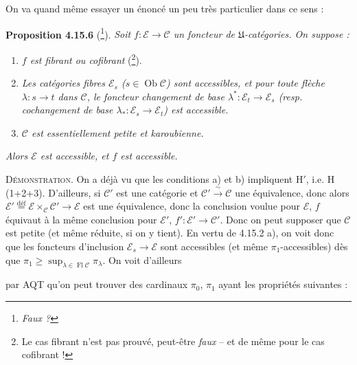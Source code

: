 \documentclass[11pt]{article}
\newcommand{\msp}[1]{\marginpar{\footnotesize [#1]}}
\newcommand{\cE}{\mathcal{E}}
\newcommand{\cC}{\mathcal{C}}
\newcommand{\Ob}{\operatorname{Ob}}
\newcommand{\Fl}{\operatorname{Fl}}
\begin{document}
On va quand même essayer un énoncé un peu très particulier dans ce sens :

\msp{page 435}\textbf{Proposition 4.15.6} (\footnote[180]{\textit{Faux ?}}). \textit{Soit $f : \cE \longrightarrow \cC$ un foncteur de $\mathfrak{U}$-catégories. On suppose :}
\begin{enumerate}
\item[\textit{a)}] \textit{$f$ est fibrant ou cofibrant} (\footnote[181]{Le cas fibrant n'est pas prouvé, peut-être \textit{faux} -- et de même pour le cas cofibrant !}).
\item[\textit{b)}] \textit{Les catégories fibres $\cE_s$ ($s \in \Ob \cC$) sont accessibles, et pour toute flèche $\lambda : s \longrightarrow t$ dans $\cC$, le foncteur changement de base $\lambda^* : \cE_t \longrightarrow \cE_s$ (resp. cochangement de base $\lambda_* : \cE_s \longrightarrow \cE_t$) est accessible.}
\item[\textit{c)}] \textit{$\cC$ est essentiellement petite et karoubienne.}
\end{enumerate}
\textit{Alors $\cE$ est accessible, et $f$ est accessible.}

\textsc{Démonstration}. On a déjà vu que les conditions a) et b) impliquent $\mathrm{H}'$, i.e. H (1+2+3). D'ailleurs, si $\cC'$ est une catégorie et $\cC' \xrightarrow{\ \sim\ } \cC$ une équivalence, donc alors $\cE' \overset{\text{déf}}{=} \cE \times_{\cC} \cC' \longrightarrow \cE$ est une équivalence, donc la conclusion voulue pour $\cE$, $f$ équivaut à la même conclusion pour $\cE'$, $f' : \cE' \longrightarrow \cC'$. Donc on peut supposer que $\cC$ est petite (et même réduite, si on y tient). En vertu de 4.15.2 a), on voit donc que les foncteurs d'inclusion $\cE_s \longrightarrow \cE$ sont accessibles (et même $\pi_1$-accessibles) dès que $\pi_1 \geqslant \sup_{\lambda \in \Fl \cC} \pi_{\lambda}$. On voit d'ailleurs

\msp{page 436}par AQT qu'on peut trouver des cardinaux $\pi_0$, $\pi_1$ ayant les propriétés suivantes :
\end{document}
